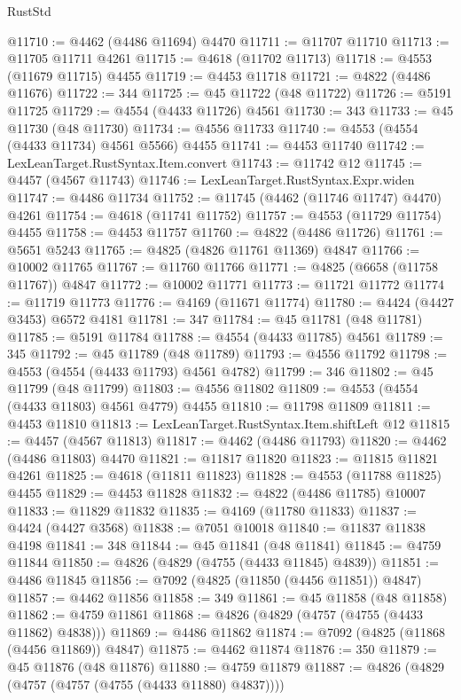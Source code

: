 \begin{lexlean}{RustStd}
\begin{coremodule}
@11710 := @4462 (@4486 @11694) @4470
@11711 := @11707 @11710
@11713 := @11705 @11711 @4261
@11715 := @4618 (@11702 @11713)
@11718 := @4553 (@11679 @11715) @4455
@11719 := @4453 @11718
@11721 := @4822 (@4486 @11676)
@11722 := 344
@11725 := @45 @11722 (@48 @11722)
@11726 := @5191 @11725
@11729 := @4554 (@4433 @11726) @4561
@11730 := 343
@11733 := @45 @11730 (@48 @11730)
@11734 := @4556 @11733
@11740 := @4553 (@4554 (@4433 @11734) @4561 @5566) @4455
@11741 := @4453 @11740
@11742 := LexLeanTarget.RustSyntax.Item.convert
@11743 := @11742 @12
@11745 := @4457 (@4567 @11743)
@11746 := LexLeanTarget.RustSyntax.Expr.widen
@11747 := @4486 @11734
@11752 := @11745 (@4462 (@11746 @11747) @4470) @4261
@11754 := @4618 (@11741 @11752)
@11757 := @4553 (@11729 @11754) @4455
@11758 := @4453 @11757
@11760 := @4822 (@4486 @11726)
@11761 := @5651 @5243
@11765 := @4825 (@4826 @11761 @11369) @4847
@11766 := @10002 @11765
@11767 := @11760 @11766
@11771 := @4825 (@6658 (@11758 @11767)) @4847
@11772 := @10002 @11771
@11773 := @11721 @11772
@11774 := @11719 @11773
@11776 := @4169 (@11671 @11774)
@11780 := @4424 (@4427 @3453) @6572 @4181
@11781 := 347
@11784 := @45 @11781 (@48 @11781)
@11785 := @5191 @11784
@11788 := @4554 (@4433 @11785) @4561
@11789 := 345
@11792 := @45 @11789 (@48 @11789)
@11793 := @4556 @11792
@11798 := @4553 (@4554 (@4433 @11793) @4561 @4782)
@11799 := 346
@11802 := @45 @11799 (@48 @11799)
@11803 := @4556 @11802
@11809 := @4553 (@4554 (@4433 @11803) @4561 @4779) @4455
@11810 := @11798 @11809
@11811 := @4453 @11810
@11813 := LexLeanTarget.RustSyntax.Item.shiftLeft @12
@11815 := @4457 (@4567 @11813)
@11817 := @4462 (@4486 @11793)
@11820 := @4462 (@4486 @11803) @4470
@11821 := @11817 @11820
@11823 := @11815 @11821 @4261
@11825 := @4618 (@11811 @11823)
@11828 := @4553 (@11788 @11825) @4455
@11829 := @4453 @11828
@11832 := @4822 (@4486 @11785) @10007
@11833 := @11829 @11832
@11835 := @4169 (@11780 @11833)
@11837 := @4424 (@4427 @3568)
@11838 := @7051 @10018
@11840 := @11837 @11838 @4198
@11841 := 348
@11844 := @45 @11841 (@48 @11841)
@11845 := @4759 @11844
@11850 := @4826 (@4829 (@4755 (@4433 @11845) @4839))
@11851 := @4486 @11845
@11856 := @7092 (@4825 (@11850 (@4456 @11851)) @4847)
@11857 := @4462 @11856
@11858 := 349
@11861 := @45 @11858 (@48 @11858)
@11862 := @4759 @11861
@11868 := @4826 (@4829 (@4757 (@4755 (@4433 @11862) @4838)))
@11869 := @4486 @11862
@11874 := @7092 (@4825 (@11868 (@4456 @11869)) @4847)
@11875 := @4462 @11874
@11876 := 350
@11879 := @45 @11876 (@48 @11876)
@11880 := @4759 @11879
@11887 := @4826 (@4829 (@4757 (@4757 (@4755 (@4433 @11880) @4837))))

\end{coremodule}
\end{lexlean}
